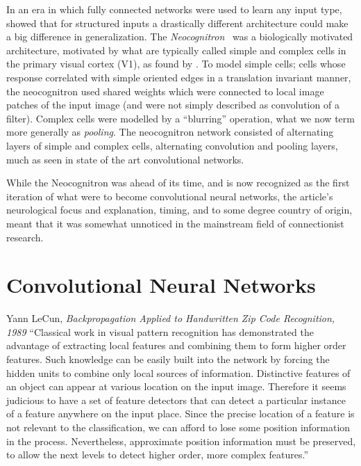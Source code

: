 \documentclass[thesis]{subfiles}
\begin{document}
	In an era in which fully connected networks were used to learn any input type, \citet{Fuk80} showed that for structured inputs a drastically different architecture could make a big difference in generalization. The \emph{Neocognitron}~\citep{Fuk80, fukushima2013artificial} was a biologically motivated architecture, motivated by what are typically called simple and complex cells in the primary visual cortex (V1), as found by \citet{Hubel1959a}. To model simple cells; cells whose response correlated with simple oriented edges in a translation invariant manner, the neocognitron used shared weights which were connected to local image patches of the input image (and were not simply described as convolution of a filter). Complex cells were modelled by a ``blurring'' operation, what we now term more generally as \emph{pooling}. The neocognitron network consisted of alternating layers of simple and complex cells, \ie alternating convolution and pooling layers, much as seen in state of the art convolutional networks.

	While the Neocognitron was ahead of its time, and is now recognized as the first iteration of what were to become convolutional neural networks, the article's neurological focus and explanation, timing, and to some degree country of origin, meant that it was somewhat unnoticed in the mainstream field of connectionist research. %
	
	\section{Convolutional Neural Networks}
	\begin{chapquote}{Yann LeCun, \textit{Backpropagation Applied to Handwritten Zip Code Recognition, 1989}}
		``Classical work in visual pattern recognition has demonstrated the advantage of extracting local features and combining them to form higher order features. Such knowledge can be easily built into the network by forcing the hidden units to combine only local sources of information. Distinctive features of an object can appear at various location on the input image. Therefore it seems judicious to have a set of feature detectors that can detect a particular instance of a feature anywhere on the input place. Since the precise location of a feature is not relevant to the classification, we can afford to lose some position information in the process. Nevertheless, approximate position information must be preserved, to allow the next levels to detect higher order, more complex features.''
	\end{chapquote}
	
\end{document}
